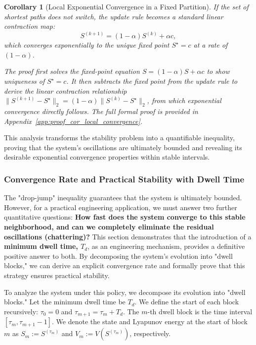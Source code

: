 \documentclass[journal]{IEEEtran}
\newtheorem{corollary}{Corollary}
\begin{document}
\begin{corollary}[Local Exponential Convergence in a Fixed Partition]
\label{cor:local_convergence}
If the set of shortest paths does not switch, the update rule becomes a standard linear contraction map:
\begin{equation}\label{eq:linear_update}
S^{(k+1)}=(1-\alpha)S^{(k)}+\alpha c,
\end{equation}
which converges exponentially to the unique fixed point $S^\star=c$ at a rate of $(1-\alpha)$.

\begin{IEEEproof}
The proof first solves the fixed-point equation $S=(1-\alpha)S+\alpha c$ to show uniqueness of $S^\star=c$. It then subtracts the fixed point from the update rule to derive the linear contraction relationship $\|S^{(k+1)}-S^\star\|_2 = (1-\alpha)\|S^{(k)}-S^\star\|_2$, from which exponential convergence directly follows.
\textit{The full formal proof is provided in Appendix~\ref{app:proof_cor_local_convergence}.}
\end{IEEEproof}
\end{corollary}

This analysis transforms the stability problem into a quantifiable inequality, proving that the system's oscillations are ultimately bounded and revealing its desirable exponential convergence properties within stable intervals.

\subsubsection{Convergence Rate and Practical Stability with Dwell Time}
\label{subsec:practical_stability_rate}

The "drop-jump" inequality guarantees that the system is ultimately bounded. However, for a practical engineering application, we must answer two further quantitative questions: \textbf{How fast does the system converge to this stable neighborhood, and can we completely eliminate the residual oscillations (chattering)?} This section demonstrates that the introduction of a \textbf{minimum dwell time, $T_d$}, as an engineering mechanism, provides a definitive positive answer to both. By decomposing the system's evolution into "dwell blocks," we can derive an explicit convergence rate and formally prove that this strategy ensures practical stability.

To analyze the system under this policy, we decompose its evolution into "dwell blocks."
Let the minimum dwell time be $T_d$. We define the start of each block recursively: $\tau_0=0$ and $\tau_{m+1} = \tau_m + T_d$. The $m$-th dwell block is the time interval $[\tau_m, \tau_{m+1}-1]$. We denote the state and Lyapunov energy at the start of block $m$ as $S_m := S^{(\tau_m)}$ and $V_m := V(S^{(\tau_m)})$, respectively.
\end{document}
